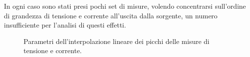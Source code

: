 In ogni caso sono stati presi pochi set di misure, volendo concentrarsi sull'ordine di grandezza di tensione e corrente all'uscita dalla sorgente, un numero insufficiente per l'analisi di questi effetti.


\begin{figure}
\centering
{}
\newline
{}
\caption{Parametri dell'interpolazione lineare dei picchi delle misure di tensione e corrente.}
\label{fig:fitlin_cor}
\end{figure}

